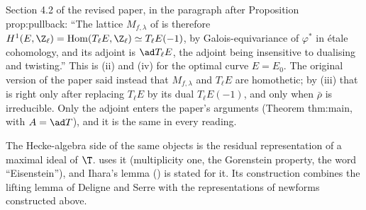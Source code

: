 \begin{paperlink}
Section 4.2 of the revised paper, in the paragraph after Proposition prop:pullback: ``The lattice $M_{f,\lambda}$ of \cite{DFG04} is therefore
$H^1(E,\Z_\ell)=\operatorname{Hom}(T_\ell E,\Z_\ell)\simeq T_\ell E(-1)$, by Galois-equivariance of $\varphi^*$ in \'etale cohomology, and its adjoint is $\ad T_\ell E$, the adjoint
being insensitive to dualising and twisting.'' This is (ii) and (iv) for the optimal curve $E=E_0$. The original
version of the paper said instead that $M_{f,\lambda}$ and $T_\ell E$ are homothetic; by (iii) that is right only after replacing $T_\ell E$ by its dual
$T_\ell E(-1)$, and only when $\bar\rho$ is irreducible. Only the adjoint enters the paper's arguments (Theorem thm:main, with $A=\ad T$), and it is the same in
every reading.
\end{paperlink}

The Hecke-algebra side of the same objects is the residual representation of a maximal ideal of $\T$.  uses it (multiplicity one,
the Gorenstein property, the word ``Eisenstein''), and Ihara's lemma () is stated for it. Its construction combines the lifting
lemma of Deligne and Serre with the representations of newforms constructed above.


